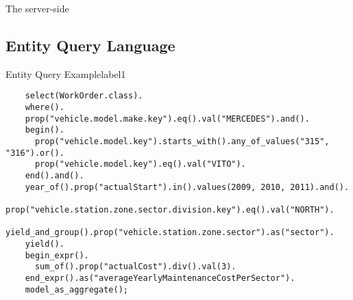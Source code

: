   The server-side 

  \subsection{Entity Query Language}
  
  \begin{code}{Entity Query Example}{label1}
  \begin{lstlisting}
    select(WorkOrder.class).
    where().
    prop("vehicle.model.make.key").eq().val("MERCEDES").and().
    begin().
      prop("vehicle.model.key").starts_with().any_of_values("315", "316").or().
      prop("vehicle.model.key").eq().val("VITO").
    end().and().
    year_of().prop("actualStart").in().values(2009, 2010, 2011).and().
    prop("vehicle.station.zone.sector.division.key").eq().val("NORTH").
    yield_and_group().prop("vehicle.station.zone.sector").as("sector").
    yield().
    begin_expr().
      sum_of().prop("actualCost").div().val(3).
    end_expr().as("averageYearlyMaintenanceCostPerSector").
    model_as_aggregate();
  \end{lstlisting}
  \end{code}
  
  


